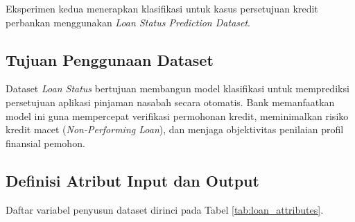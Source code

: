 \documentclass[a4paper,oneside,12pt]{report}
\begin{document}
Eksperimen kedua menerapkan klasifikasi untuk kasus persetujuan kredit perbankan menggunakan \textit{Loan Status Prediction Dataset}.

\subsection{Tujuan Penggunaan Dataset}
Dataset \textit{Loan Status} bertujuan membangun model klasifikasi untuk memprediksi persetujuan aplikasi pinjaman nasabah secara otomatis. Bank memanfaatkan model ini guna mempercepat verifikasi permohonan kredit, meminimalkan risiko kredit macet (\textit{Non-Performing Loan}), dan menjaga objektivitas penilaian profil finansial pemohon.

\subsection{Definisi Atribut Input dan Output}
Daftar variabel penyusun dataset dirinci pada Tabel \ref{tab:loan_attributes}.
\end{document}
